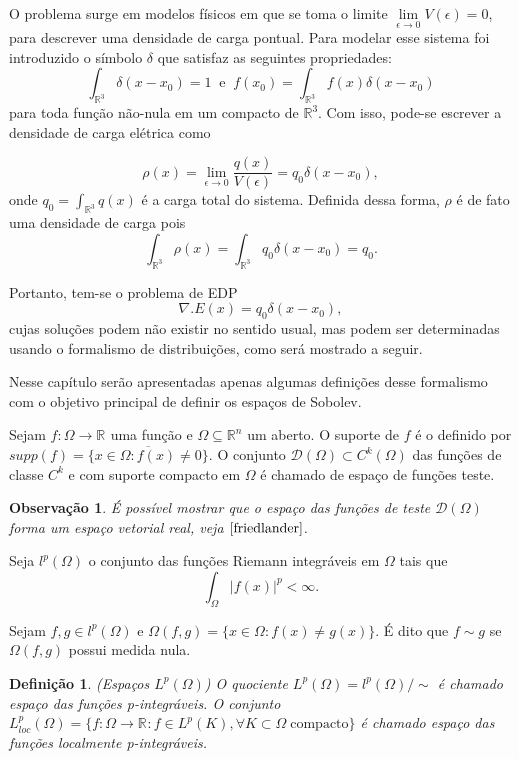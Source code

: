 \documentclass[12pt]{book}
\newtheorem{definicao}[teorema]{Definição}
\newtheorem{observacao}[teorema]{Observação}
\newcommand{\espacoLp}[1]{L^{p}(#1)}
\newcommand{\espacoLpcomp}[1]{L^{p}_{loc}(#1)}
\newcommand{\espacoLpGeral}[2]{L^{#1}(#2)}
\newcommand{\funcoesdiferenciaveis}[2]{C^{#1}(#2)}
\newcommand{\funcoesteste}{\funcoestestegeral{\Omega}}
\newcommand{\funcoestestegeral}[1]{\mathcal{D}(#1)}
\newcommand{\real}[1]{\mathbb{R}^{#1}}
\newcommand{\reta}{\real{}}
\begin{document}
	O problema surge em modelos físicos em que se toma o limite $\lim\limits_{\epsilon\to 0}V(\epsilon)=0$, para descrever uma densidade de carga pontual. Para modelar esse sistema foi introduzido o símbolo $\delta$ que satisfaz as seguintes propriedades:
	$$
	\int_{\real{3}}\delta(x-x_{0}) = 1\;\;\text{e}\;\; 	f(x_{0})=\int_{\real{3}}f(x)\delta(x-x_{0})
	$$
	para toda função não-nula em um compacto de $\real{3}$. Com isso, pode-se escrever a densidade de carga elétrica como
	
	$$
	\rho(x) = \lim_{\epsilon\to 0} \frac{q(x)}{V(\epsilon)} = q_{0}\delta(x - x_{0}),
	$$
	onde $q_{0} =\int_{\real{3}}q(x)$ é a carga total do sistema. Definida dessa forma, $\rho$ é de fato uma densidade de carga pois
	$$
	\int_{\real{3}}\rho(x) = \int_{\real{3}}q_{0}\delta(x-x_{0}) = q_{0}.
	$$
	
	Portanto, tem-se o problema de EDP
	$$
	\nabla.E(x) = q_{0}\delta(x-x_{0}),
	$$
	cujas soluções podem não existir no sentido usual, mas podem ser determinadas usando o formalismo de distribuições, como será mostrado a seguir.
	

	Nesse capítulo serão apresentadas apenas algumas definições desse formalismo com o objetivo principal de definir os espaços de Sobolev.
	
	Sejam $f:\Omega\to \reta$ uma função e $\Omega \subseteq \real{n}$ um aberto. O suporte de $f$ é o definido por $supp(f) = \overline{\{ x\in \Omega: f(x)\neq 0 \}}$. O conjunto $\funcoesteste \subset \funcoesdiferenciaveis{k}{\Omega}$ das funções de classe $C^{k}$ e com suporte compacto em $\Omega$ é chamado de espaço de funções teste.
	
	\begin{observacao}
		É possível mostrar que o espaço das funções de teste $\funcoesteste$ forma um espaço vetorial real, veja $\cite{friedlander}$.
	\end{observacao}
	
	Seja $l^{p}(\Omega)$ o conjunto das funções Riemann integráveis em $\Omega$ tais que 
	$$
	\int_{\Omega}|f(x)|^{p} <\infty.$$ 
	
	Sejam $f,g \in l^{p}(\Omega)$ e $\Omega(f,g) = \{x\in \Omega: f(x) \neq g(x)\}$. É dito que $f \sim g$ se $\Omega(f,g)$ possui medida nula.
	
	\begin{definicao}\label{definicao_espaco_Lp}
		(Espaços $\espacoLpGeral{p}{\Omega}$) O quociente $\espacoLpGeral{p}{\Omega}=l^{p}(\Omega)/\sim$ é chamado espaço das funções p-integráveis. O conjunto $\espacoLpcomp{\Omega} = \{f:\Omega\to \reta: f \in \espacoLp{K}, \forall K \subset \Omega \;\text{compacto}\}$ é chamado espaço das funções localmente p-integráveis.
	\end{definicao}
	
\end{document}
